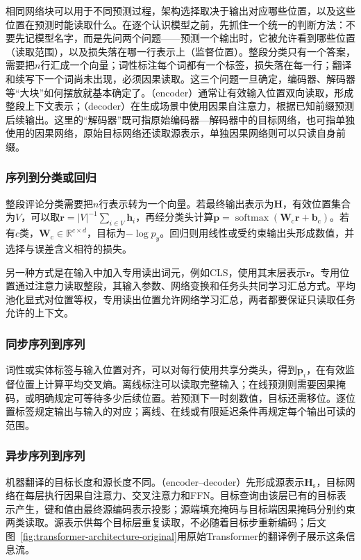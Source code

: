 相同网络块可以用于不同预测过程，架构选择取决于输出对应哪些位置，以及这些位置在预测时能读取什么。在逐个认识模型之前，先抓住一个统一的判断方法：不要先记模型名字，而是先问两个问题——预测一个输出时，它被允许看到哪些位置（读取范围），以及损失落在哪一行表示上（监督位置）。整段分类只有一个答案，需要把$n$行汇成一个向量；词性标注每个词都有一个标签，损失落在每一行；翻译和续写下一个词尚未出现，必须因果读取。这三个问题一旦确定，编码器、解码器等“大块”如何摆放就基本确定了。（encoder）通常让有效输入位置双向读取，形成整段上下文表示；（decoder）在生成场景中使用因果自注意力，根据已知前缀预测后续输出。这里的“解码器”既可指原始编码器—解码器中的目标网络，也可指单独使用的因果网络，原始目标网络还读取源表示，单独因果网络则可以只读自身前缀。

\subsubsection{序列到分类或回归}

整段评论分类需要把$n$行表示转为一个向量。若最终输出表示为$\bm H$，有效位置集合为$V$，可以取$\bm r=|V|^{-1}\sum_{i\in V}\bm h_i$，再经分类头计算$\bm p=\operatorname{softmax}(\bm W_{\mathrm c}\bm r+\bm b_{\mathrm c})$。若有$c$类，$\bm W_{\mathrm c}\in\mathbb R^{c\times d}$，目标为$-\log p_y$。回归则用线性或受约束输出头形成数值，并选择与误差含义相符的损失。

另一种方式是在输入中加入专用读出词元，例如CLS，使用其末层表示$\bm r$。专用位置通过注意力读取整段，其输入参数、网络变换和任务头共同学习汇总方式。平均池化显式对位置等权，专用读出位置允许网络学习汇总，两者都要保证只读取任务允许的上下文。

\subsubsection{同步序列到序列}

词性或实体标签与输入位置对齐，可以对每行使用共享分类头，得到$\bm p_i$，在有效监督位置上计算平均交叉熵。离线标注可以读取完整输入；在线预测则需要因果掩码，或明确规定可等待多少后续位置。若预测下一时刻数值，目标还需移位。逐位置标签规定输出与输入的对应；离线、在线或有限延迟条件再规定每个输出可读的范围。

\subsubsection{异步序列到序列}

机器翻译的目标长度和源长度不同。（encoder--decoder）先形成源表示$\bm H_{\mathrm s}$，目标网络在每层执行因果自注意力、交叉注意力和FFN。目标查询由该层已有的目标表示产生，键和值由最终源编码表示投影；源端填充掩码与目标端因果掩码分别约束两类读取。源表示供每个目标层重复读取，不必随着目标步重新编码；后文图~\ref{fig:transformer-architecture-original}用原始Transformer的翻译例子展示这条信息流。

